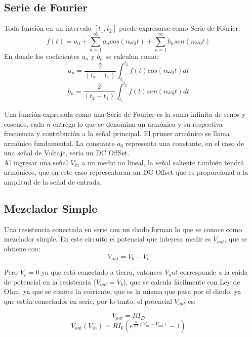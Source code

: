 \documentclass[letterpaper,oneside]{article}
\begin{document}
\subsection{Serie de Fourier}
Toda función en un intervalo $[t_1,t_2]$ puede expresarse como Serie de Fourier:
\begin{equation}
    f(t) = a_0 + \sum_{n=1}^{\infty} a_n cos(n \omega_0 t) + \sum_{n=1}^{\infty} b_n sen(n \omega_0 t)
\end{equation}
En donde los coeficientes $a_n$ y $b_n$ se calculan como:
\begin{equation}
    a_n = \frac{2}{(t_2-t_1)}\int_{t_1}^{t_2}f(t)cos(n\omega_0t)dt
\end{equation}
\begin{equation}
    b_n = \frac{2}{(t_2-t_1)}\int_{t_1}^{t_2}f(t)sen(n\omega_0t)dt
\end{equation}

Una función expresada como una Serie de Fourier es la suma infinita de senos y cosenos, cada $n$ entrega lo que se denomina un armónico y su respectiva frecuencia y contribución a la señal principal. El primer armónico se llama armónico fundamental. La constante $a_0$ representa una constante, en el caso de una señal de Voltaje, sería un DC OffSet. \\

Al ingresar una señal $V_{in}$ a un medio no lineal, la señal saliente también tendrá armónicos, que en este caso representaran un DC Offset que es proporcional a la amplitud de la señal de entrada.

\subsection{Mezclador Simple}
Una resistencia conectada en serie con un diodo forman lo que se conoce como mezclador simple. En este circuito el potencial que interesa medir es $V_{out}$, que se obtiene con: \\

$$ V_{out} = V_b - V_c$$

Pero $V_c=0$ ya que está conectado a tierra, entonces $V_out$ corresponde a la caída de potencial en la resistencia ($V_{out}=V_b$), que se calcula fácilmente con Ley de Ohm, ya que se conoce la corriente, que es la misma que pasa por el diodo, ya que están conectados en serie, por lo tanto, el potencial $V_{out}$ es:

$$V_{out} = R I_{D} $$
\begin{equation}
    V_{out}(V_{in})= R I_0(e^{\frac{q}{KT}(V_{in}-V_{out})}-1)
\end{equation}
\end{document}
